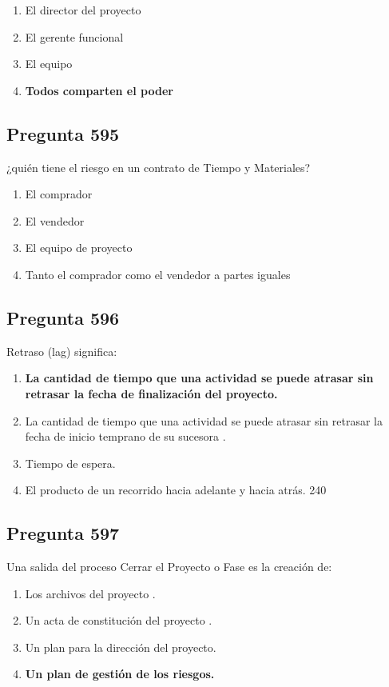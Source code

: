 \documentclass[11pt,a4paper]{article}
\begin{document}
\begin{enumerate}[label=\alph*)]
  \item El director del proyecto
  \item El gerente funcional
  \item El equipo
  \item \textbf{Todos comparten el poder}
\end{enumerate}

\subsection*{Pregunta 595}
¿quién tiene el riesgo en un contrato de Tiempo y Materiales?

\begin{enumerate}[label=\alph*)]
  \item El comprador
  \item El vendedor
  \item El equipo de proyecto
  \item Tanto el comprador como el vendedor a partes iguales
\end{enumerate}

\subsection*{Pregunta 596}
Retraso (lag) significa:

\begin{enumerate}[label=\alph*)]
  \item \textbf{La cantidad de tiempo que una actividad se puede atrasar sin retrasar la fecha de finalización del proyecto.}
  \item La cantidad de tiempo que una actividad se puede atrasar sin retrasar la fecha de inicio temprano de su sucesora .
  \item Tiempo de espera.
  \item El producto de un recorrido hacia adelante y hacia atrás. 240
\end{enumerate}

\subsection*{Pregunta 597}
Una salida del proceso Cerrar el Proyecto o Fase es la creación de:

\begin{enumerate}[label=\alph*)]
  \item Los archivos del proyecto .
  \item Un acta de constitución del proyecto .
  \item Un plan para la dirección del proyecto.
  \item \textbf{Un plan de gestión de los riesgos.}
\end{enumerate}
\end{document}

